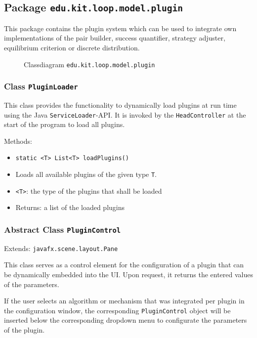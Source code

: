 \documentclass[parskip=full,11pt]{scrartcl}
\begin{document}
\subsection{Package \texttt{edu.kit.loop.model.plugin}}

This package contains the plugin system which can be used to integrate own implementations of the pair builder, success quantifier, strategy adjuster, equilibrium criterion or discrete distribution.

\iftrue
\begin{figure}[h]
	\centering
	\fontsize{5.75}{8}\selectfont
	

	\caption{Classdiagram \texttt{edu.kit.loop.model.plugin}}
\end{figure}
\fi
\subsubsection{Class \texttt{PluginLoader}}

This class provides the functionality to dynamically load plugins at run time using the Java \texttt{ServiceLoader}-API. It is invoked by the \texttt{HeadController} at the start of the program to load all plugins.

Methods:

\begin{itemize}\itemsep -10pt
	\item \texttt{static <T> List<T> loadPlugins()}
	\item[] Loads all available plugins of the given type \texttt{T}.
	\item[] \texttt{<T>}: the type of the plugins that shall be loaded
	\item[]Returns: a list of the loaded plugins
\end{itemize}

\subsubsection{Abstract Class \texttt{PluginControl}}
Extends: \texttt{javafx.scene.layout.Pane}

This class serves as a control element for the configuration of a plugin that can be dynamically embedded into the UI. Upon request, it returns the entered values of the parameters.

If the user selects an algorithm or mechanism that was integrated per plugin in the configuration window, the corresponding \texttt{PluginControl} object will be inserted below the corresponding dropdown menu to configurate the parameters of the plugin.
\end{document}
